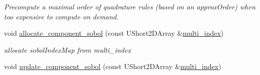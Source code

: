 \begin{DoxyCompactItemize}
\begin{DoxyCompactList}\small\item\em Precompute a maximal order of quadrature rules (based on an approx\+Order) when too expensive to compute on demand. \end{DoxyCompactList}\item 
void \hyperlink{classPecos_1_1SharedOrthogPolyApproxData_a8f69cf7256f6caaabcbbd10667ca378b}{allocate\+\_\+component\+\_\+sobol} (const U\+Short2\+D\+Array \&\hyperlink{classPecos_1_1SharedOrthogPolyApproxData_ad93cb921a0df31fce4696f0051fe6a33}{multi\+\_\+index})\label{classPecos_1_1SharedOrthogPolyApproxData_a8f69cf7256f6caaabcbbd10667ca378b}

\begin{DoxyCompactList}\small\item\em allocate sobol\+Index\+Map from multi\+\_\+index \end{DoxyCompactList}\item 
void \hyperlink{classPecos_1_1SharedOrthogPolyApproxData_a3b449e2db15850e64a07ec45fee45e77}{update\+\_\+component\+\_\+sobol} (const U\+Short2\+D\+Array \&\hyperlink{classPecos_1_1SharedOrthogPolyApproxData_ad93cb921a0df31fce4696f0051fe6a33}{multi\+\_\+index})\label{classPecos_1_1SharedOrthogPolyApproxData_a3b449e2db15850e64a07ec45fee45e77}


\end{DoxyCompactItemize}
